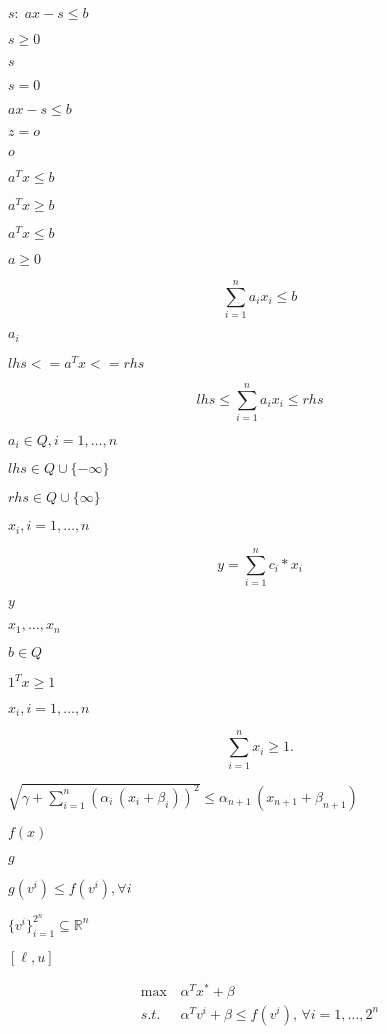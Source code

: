 \documentclass{article}
\begin{document}
$s:\; ax - s \leq b$
\pagebreak

$s \geq
0$
\pagebreak

$s$
\pagebreak

$s = 0$
\pagebreak

$ax - s \leq b$
\pagebreak

$z = o$
\pagebreak

$o$
\pagebreak

$a^T x \leq b$
\pagebreak

$a^T x \geq b$
\pagebreak

$a^T x \le b$
\pagebreak

$a \ge 0$
\pagebreak

\[
  \sum_{i=1}^n a_i x_i \leq b
\]
\pagebreak

$a_i$
\pagebreak

$lhs <= a^T x <= rhs$
\pagebreak

\[
  lhs \leq \sum_{i=1}^n a_i x_i \leq rhs
\]
\pagebreak

$a_i \in Q, i = 1,\dots,n$
\pagebreak

$lhs\in Q \cup \{-\infty\}$
\pagebreak

$rhs\in Q \cup \{\infty\}$
\pagebreak

$x_i, i = 1,\dots,n$
\pagebreak

\[
y = \sum_{i=1}^n {c_i * x_i}
\]
\pagebreak

$ y $
\pagebreak

$ x_1, \dots, x_n $
\pagebreak

$b \in Q$
\pagebreak

$1^T x \ge 1$
\pagebreak

$x_i, i=1,\dots,n$
\pagebreak

\[
  \sum_{i=1}^n x_i \ge 1.
\]
\pagebreak

$\sqrt{\gamma + \sum_{i=1}^{n} (\alpha_i\, (x_i + \beta_i))^2} \leq \alpha_{n+1}\, (x_{n+1}+\beta_{n+1})$
\pagebreak

$ f(x) $
\pagebreak

$ g $
\pagebreak

$ g(v^i) \leq f(v^i), \forall i $
\pagebreak

$ \{ v^i \}_{i = 1}^{2^n} \subseteq \mathbb R^n $
\pagebreak

$ [\ell,u] $
\pagebreak

\begin{align*}
             \max \, & \alpha^T x^* + \beta \\
    s.t. \; & \alpha^T v^i + \beta \le f(v^i), \, \forall i = 1, \ldots, 2^n
\end{align*}
\pagebreak
\end{document}
